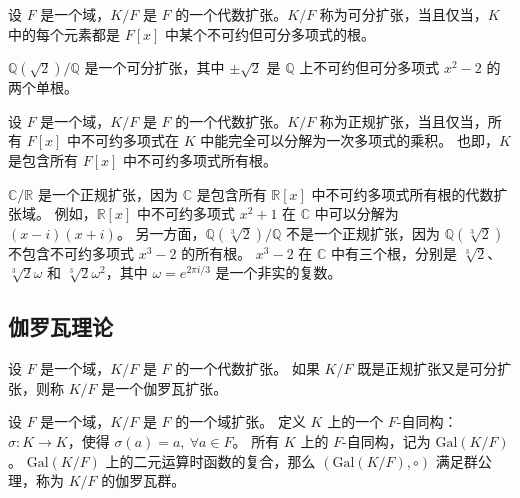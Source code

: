 \begin{definition}
    设 $F$ 是一个域，$K/F$ 是 $F$ 的一个代数扩张。$K/F$ 称为可分扩张，当且仅当，$K$ 中的每个元素都是 $F[x]$ 中某个不可约但可分多项式的根。
\end{definition}
\begin{note}
    $\mathbb{Q}(\sqrt{2})/\mathbb{Q}$ 是一个可分扩张，其中 $\pm\sqrt{2}$ 是 $\mathbb{Q}$ 上不可约但可分多项式 $x^2-2$ 的两个单根。
\end{note}
\vspace{1em}

\begin{definition}
    设 $F$ 是一个域，$K/F$ 是 $F$ 的一个代数扩张。$K/F$ 称为正规扩张，当且仅当，所有 $F[x]$ 中不可约多项式在 $K$ 中能完全可以分解为一次多项式的乘积。
    也即，$K$ 是包含所有 $F[x]$ 中不可约多项式所有根。
    \label{def:normal_extension}
\end{definition}

\begin{note}
    $\mathbb{C}/\mathbb{R}$ 是一个正规扩张，因为 $\mathbb{C}$ 是包含所有 $\mathbb{R}[x]$ 中不可约多项式所有根的代数扩张域。
    例如，$\mathbb{R}[x]$ 中不可约多项式 $x^2+1$ 在 $\mathbb{C}$ 中可以分解为 $(x-i)(x+i)$。
    另一方面，$\mathbb{Q}(\sqrt[3]{2})/\mathbb{Q}$ 不是一个正规扩张，因为 $\mathbb{Q}(\sqrt[3]{2})$ 不包含不可约多项式 $x^3-2$ 的所有根。
    $x^3-2$ 在 $\mathbb{C}$ 中有三个根，分别是 $\sqrt[3]{2}$、$\sqrt[3]{2}\omega$ 和 $\sqrt[3]{2}\omega^2$，其中 $\omega = e^{2\pi i/3}$ 是一个非实的复数。
\end{note}
\vspace{1em}

\subsection{伽罗瓦理论}

\begin{definition}
    设 $F$ 是一个域，$K/F$ 是 $F$ 的一个代数扩张。
    如果 $K/F$ 既是正规扩张又是可分扩张，则称 $K/F$ 是一个伽罗瓦扩张。
    \label{def:galois_extension}
\end{definition}

\begin{definition}
    设 $F$ 是一个域，$K/F$ 是 $F$ 的一个域扩张。
    定义 $K$ 上的一个 $F$-自同构：$\sigma:K\to K$，使得 $\sigma(a)=a,\ \forall a\in F$。
    所有 $K$ 上的 $F$-自同构，记为 $\mathrm{Gal}(K/F)$。
    $\mathrm{Gal}(K/F)$ 上的二元运算时函数的复合，那么 $(\mathrm{Gal}(K/F),\circ)$ 满足群公理，称为 $K/F$ 的伽罗瓦群。
    \label{def:galois_group}
\end{definition}

